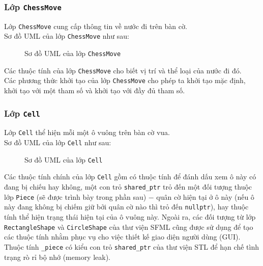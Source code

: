 \subsubsection{Lớp \lstinline{ChessMove}}
Lớp \lstinline{ChessMove} cung cấp thông tin về nước đi trên bàn cờ.\\
Sơ đồ UML của lớp \lstinline{ChessMove} như sau:
\begin{figure}[H]
\caption{Sơ đồ UML của lớp \lstinline{ChessMove}}
\end{figure}
Các thuộc tính của lớp \lstinline{ChessMove} cho biết vị trí và thể loại của nước đi đó.\\
Các phương thức khởi tạo của lớp \lstinline{ChessMove} cho phép ta khởi tạo mặc định, khởi tạo với một tham số và khởi tạo với đầy đủ tham số.

\subsubsection{Lớp \lstinline{Cell}}
Lớp \lstinline{Cell} thể hiện mỗi một ô vuông trên bàn cờ vua.\\
Sơ đồ UML của lớp \lstinline{Cell} như sau:
\begin{figure}[H]
\caption{Sơ đồ UML của lớp \lstinline{Cell}}
\end{figure}
Các thuộc tính chính của lớp \lstinline{Cell} gồm có thuộc tính để đánh dấu xem ô này có đang bị chiếu hay không, một con trỏ \lstinline{shared_ptr} trỏ đến một đối tượng thuộc lớp \lstinline{Piece} (sẽ được trình bày trong phần sau) $-$ quân cờ hiện tại ở ô này (nếu ô này đang không bị chiếm giữ bởi quân cờ nào  thì trỏ đến \lstinline{nullptr}), hay thuộc tính thể hiện trạng thái hiện tại của ô vuông này. Ngoài ra, các đối tượng từ lớp \lstinline{RectangleShape} và \lstinline{CircleShape} của thư viện SFML cũng được sử dụng để tạo các thuộc tính nhằm phục vụ cho việc thiết kế giao diện người dùng (GUI).\\
Thuộc tính \lstinline{_piece} có kiểu con trỏ \lstinline{shared_ptr} của thư viện STL để hạn chế tình trạng rò rỉ bộ nhớ (memory leak).

